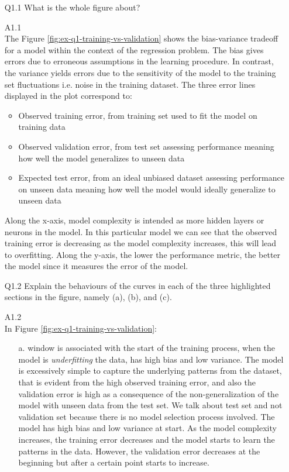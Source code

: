 \documentclass[unicode, 11pt, a4paper]{scrartcl}
\begin{document}
\begin{itemize}
	\item[Q1.1] What is the whole figure about?
	\item[A1.1] ~\\
	      The Figure \ref{fig:ex-q1-training-vs-validation} shows the bias-variance tradeoff
	      for a model within the context of the regression problem.
	      The bias gives errors due to erroneous assumptions in the learning procedure.
	      In contrast, the variance yields errors due to the sensitivity of the model
	      to the training set fluctuations i.e. noise in the training dataset.
	      The three error lines displayed in the plot correspond to:
	      \begin{itemize}
		      \item Observed training error, from training set
		            used to fit the model on training data
		      \item Observed validation error, from test set assessing performance
		            meaning how well the model generalizes to unseen data
		      \item Expected test error, from an ideal unbiased dataset
		            assessing performance on unseen data
		            meaning how well the model would ideally generalize to unseen data
	      \end{itemize}

	      Along the x-axis, model complexity is intended as more hidden layers or neurons in the model.
	      In this particular model we can see that the observed training error
	      is decreasing as the model complexity increases, this will lead to overfitting.
	      Along the y-axis, the lower the performance metric, the better the model
	      since it measures the error of the model.

	\item[Q1.2] Explain the behaviours of the curves in each of the three highlighted sections in the figure, namely (a), (b), and (c).
	\item[A1.2] ~\\
	      In Figure \ref{fig:ex-q1-training-vs-validation}:
	      \begin{itemize}
		      \item[a.] window is associated with the start of the training process,
		            when the model is \textit{underfitting} the data, has high bias and low variance.
		            The model is excessively simple to capture the underlying patterns from the dataset,
		            that is evident from the high observed training error,
		            and also the validation error is high as a consequence of the non-generalization of the model
		            with unseen data from the test set.
		            We talk about test set and not validation set
		            because there is no model selection process involved.
		            The model has high bias and low variance at start.
		            As the model complexity increases, the training error decreases
		            and the model starts to learn the patterns in the data.
		            However, the validation error decreases at the beginning
		            but after a certain point starts to increase.


\end{itemize}
\end{itemize}
\end{document}
